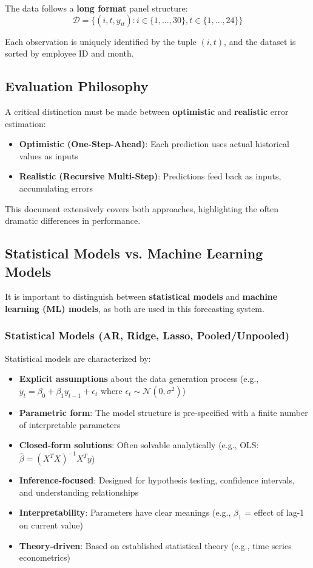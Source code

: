 \documentclass[12pt,a4paper]{article}
\begin{document}
The data follows a \textbf{long format} panel structure:
\begin{equation}
\mathcal{D} = \{(i, t, y_{it}) : i \in \{1, \ldots, 30\}, t \in \{1, \ldots, 24\}\}
\end{equation}

Each observation is uniquely identified by the tuple $(i, t)$, and the dataset is sorted by employee ID and month.

\subsection{Evaluation Philosophy}

A critical distinction must be made between \textbf{optimistic} and \textbf{realistic} error estimation:

\begin{itemize}
    \item \textbf{Optimistic (One-Step-Ahead)}: Each prediction uses actual historical values as inputs
    \item \textbf{Realistic (Recursive Multi-Step)}: Predictions feed back as inputs, accumulating errors
\end{itemize}

This document extensively covers both approaches, highlighting the often dramatic differences in performance.

\subsection{Statistical Models vs. Machine Learning Models}

It is important to distinguish between \textbf{statistical models} and \textbf{machine learning (ML) models}, as both are used in this forecasting system.

\subsubsection{Statistical Models (AR, Ridge, Lasso, Pooled/Unpooled)}

Statistical models are characterized by:
\begin{itemize}
    \item \textbf{Explicit assumptions} about the data generation process (e.g., $y_t = \beta_0 + \beta_1 y_{t-1} + \epsilon_t$ where $\epsilon_t \sim \mathcal{N}(0, \sigma^2)$)
    \item \textbf{Parametric form}: The model structure is pre-specified with a finite number of interpretable parameters
    \item \textbf{Closed-form solutions}: Often solvable analytically (e.g., OLS: $\hat{\beta} = (X^TX)^{-1}X^Ty$)
    \item \textbf{Inference-focused}: Designed for hypothesis testing, confidence intervals, and understanding relationships
    \item \textbf{Interpretability}: Parameters have clear meanings (e.g., $\beta_1$ = effect of lag-1 on current value)
    \item \textbf{Theory-driven}: Based on established statistical theory (e.g., time series econometrics)
\end{itemize}
\end{document}
